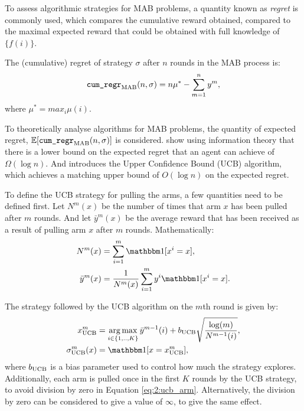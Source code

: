     To assess algorithmic strategies for MAB problems, a quantity known as \textit{regret} is commonly used, which compares the cumulative reward obtained, compared to the maximal expected reward that could be obtained with full knowledge of $\{f(i)\}$.

    \begin{defn}
        The \textnormal{(cumulative) regret} of strategy $\sigma$ after $n$ rounds in the MAB process is:
        \begin{align}
            {\textnormal{\texttt{cum\_regr}}}_{{\textnormal{MAB}}}(n,\sigma) = n\mu^* - \sum_{m=1}^n y^m, \label{eq:2:cumulative_regret_def}
        \end{align}
        where $\mu^* = max_i \mu(i)$.
    \end{defn}

    To theoretically analyse algorithms for MAB problems, the quantity of expected regret, $\mathbb{E}[{\textnormal{\texttt{cum\_regr}}}_{{\textnormal{MAB}}}(n,\sigma)]$ is considered. \citet{mab_lower_bound} show using information theory that there is a lower bound on the expected regret that an agent can achieve of $\Omega(\log n)$. And \citet{ucb} introduces the Upper Confidence Bound (UCB) algorithm, which achieves a matching upper bound of $O(\log n)$ on the expected regret. 

    To define the UCB strategy for pulling the arms, a few quantities need to be defined first. Let $N^m(x)$ be the number of times that arm $x$ has been pulled after $m$ rounds. And let $\bar{y}^m(x)$ be the average reward that has been received as a result of pulling arm $x$ after $m$ rounds. Mathematically:
    \begin{align}
        N^m(x) &= \sum_{i=1}^m \one[x^i = x], \label{eq:2:mab_num_arm_pulls_def} \\
        \bar{y}^m(x) &= \frac{1}{N^m(x)} \sum_{i=1}^m y^i \one[x^i = x]. \label{eq:2:mab_arm_sample_avg} 
    \end{align}

    The strategy followed by the UCB algorithm on the $m$th round is given by:
    \begin{align}
        x^m_{\ucb} &= \argmax_{i\in\{1,..,K\}} \bar{y}^{m-1}(i) + b_{\ucb} \sqrt{\frac{\log(m)}{N^{m-1}(i)}}, \label{eq:2:ucb_arm} \\
        \sigma^m_{\ucb}(x) &= \one[x=x^m_{\ucb}], \label{eq:2:ucb_strategy}
    \end{align}
    where $b_{{\textnormal{UCB}}}$ is a bias parameter used to control how much the strategy explores. Additionally, each arm is pulled once in the first $K$ rounds by the UCB strategy, to avoid division by zero in Equation \ref{eq:2:ucb_arm}. Alternatively, the division by zero can be considered to give a value of $\infty$, to give the same effect.




